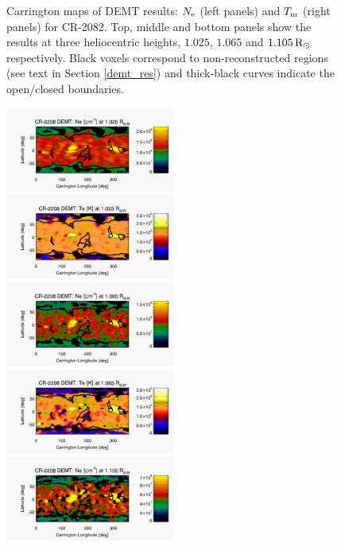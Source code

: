 \documentclass[namedreferences]{solarphysics}
\newcommand{\mrsun}{{\rm R_\odot}}
\newcommand{\Tm}{T_{\rm m}}
\newcommand{\Ne}{N_{\rm e}}
\begin{document}
\begin{article}
\begin{figure}[h!]
\begin{center}
\caption{Carrington maps of DEMT results: $\Ne$ (left panels) and $\Tm$ (right panels) for CR-2082. Top, middle and bottom panels show the results at three heliocentric heights, $1.025$, $1.065$ and $1.105\,\mrsun$ respectively. Black voxels correspond to non-reconstructed regions (see text in Section \ref{demt_res}) and thick-black curves indicate the open/closed boundaries.}
\label{carmaps_demt_2082}
\end{center}
\end{figure}

\begin{figure}[h!]
\begin{center}
\includegraphics[width=0.495\textwidth]{figs/map_Ne_CR2208_DEMT-AIA_H1_L522_r3d_1025_Rsun.pdf}
\includegraphics[width=0.495\textwidth]{figs/map_Tm_CR2208_DEMT-AIA_H1_L522_r3d_1025_Rsun.pdf}
\includegraphics[width=0.495\textwidth]{figs/map_Ne_CR2208_DEMT-AIA_H1_L522_r3d_1065_Rsun.pdf}
\includegraphics[width=0.495\textwidth]{figs/map_Tm_CR2208_DEMT-AIA_H1_L522_r3d_1065_Rsun.pdf}
\includegraphics[width=0.495\textwidth]{figs/map_Ne_CR2208_DEMT-AIA_H1_L522_r3d_1105_Rsun.pdf}

\end{center}
\end{figure}
\end{article}
\end{document}
